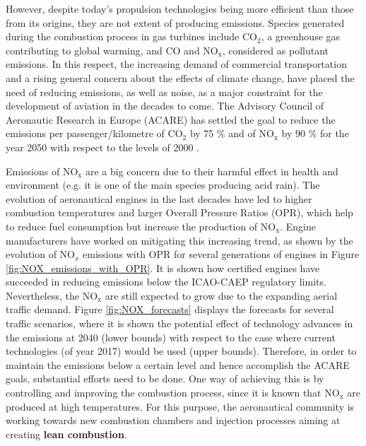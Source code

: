 However, despite today's propulsion technologies being more efficient than those from its origins, they are not extent of producing emissions. Species generated during the combustion process in gas turbines include CO$_2$, a greenhouse gas contributing to global warming, and CO and NO$_\mathrm{x}$, considered as pollutant emissions. In this respect, the increasing demand of commercial transportation and a rising general concern about the effects of climate change, have placed the need of reducing emissions, as well as noise, as a major constraint for the development of aviation in the decades to come. The Advisory Council of Aeronautic Research in Europe (ACARE) has settled the goal to reduce the emissions per passenger/kilometre of CO$_2$ by 75 $\%$ and of NO$_\mathrm{x}$ by 90 $\%$ for the year 2050 with respect to the levels of 2000 .

Emissions of NO$_\mathrm{x}$ are a big concern due to their harmful effect in health and environment (e.g. it is one of the main species producing acid rain). The evolution of aeronautical engines in the last decades have led to higher combustion temperatures and larger Overall Pressure Ratios (OPR), which help to reduce fuel consumption but increase the production of NO$_\mathrm{x}$. Engine manufacturers have worked on mitigating this increasing trend, as shown by the evolution of NO$_x$ emissions with OPR for several generations of engines in Figure \ref{fig:NOX_emissions_with_OPR}. It is shown how certified engines have succeeded in reducing emissions below the ICAO-CAEP regulatory limits. Nevertheless, the NO$_\mathrm{x}$ are still expected to grow due to the expanding aerial traffic demand. Figure \ref{fig:NOX_forecasts} displays the forecasts for several traffic scenarios, where it is shown the potential effect of technology advances in the emissions at 2040 (lower bounds) with respect to the case where current technologies (of year 2017) would be used (upper bounds). Therefore, in order to maintain the emissions below a certain level and hence accomplish the ACARE goals, substantial efforts need to be done. One way of achieving this is by controlling and improving the combustion process, since it is known that NO$_\mathrm{x}$ are produced at high temperatures. For this purpose, the aeronautical community is working towards new combustion chambers and injection processes aiming at creating \textbf{lean combustion}.

